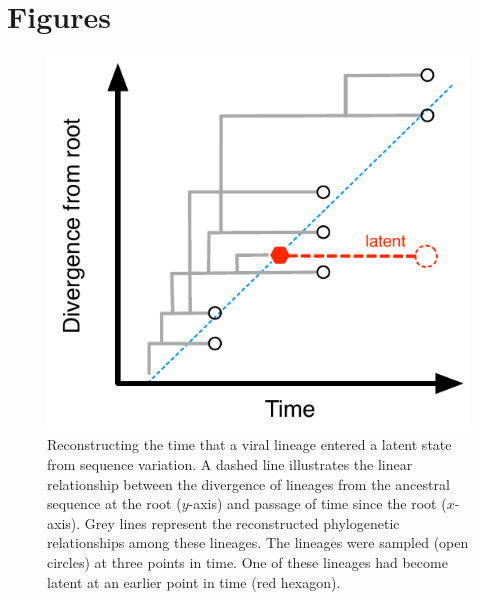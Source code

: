 \documentclass[12pt]{article}
\begin{document}

\clearpage





\clearpage


\section * {Figures}

\begin{figure}[ht]
	\centering
	\includegraphics{figures/latency-scheme}
	\caption[]{ 
	Reconstructing the time that a viral lineage entered a latent state from sequence variation.  
	A dashed line illustrates the linear relationship between the divergence of lineages from the ancestral sequence at the root ($y$-axis) and passage of time since the root ($x$-axis).
	Grey lines represent the reconstructed phylogenetic relationships among these lineages.
	The lineages were sampled (open circles) at three points in time.
	One of these lineages had become latent at an earlier point in time (red hexagon).
}
\end{figure}
\end{document}
